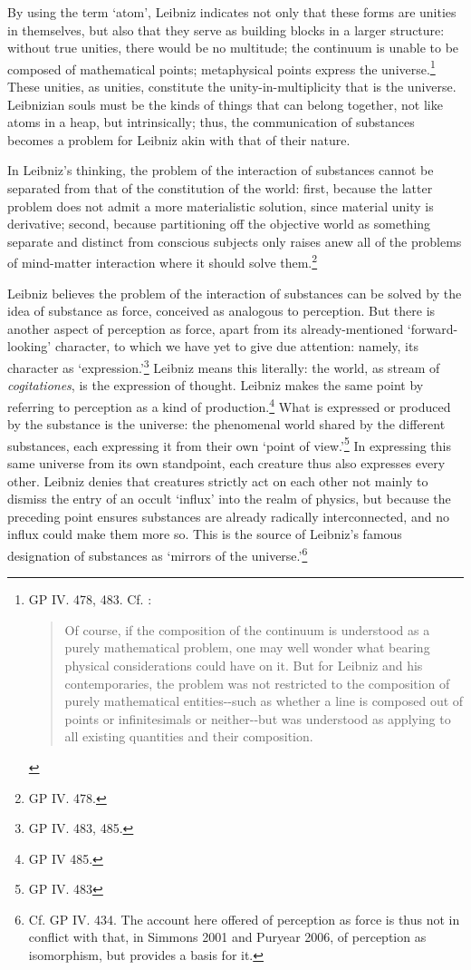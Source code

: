 \documentclass{article}
\begin{document}
By using the term `atom', Leibniz indicates not only that these forms
are unities in themselves, but also that they serve as building blocks
in a larger structure: without true unities, there would be no
multitude; the continuum is unable to be composed of mathematical
points; metaphysical points express the universe.\footnote{GP IV. 478,
  483. Cf. \autocite{Arthur1998}:

  \begin{quote}
  Of course, if the composition of the continuum is understood as a
  purely mathematical problem, one may well wonder what bearing physical
  considerations could have on it. But for Leibniz and his
  contemporaries, the problem was not restricted to the composition of
  purely mathematical entities-\/-such as whether a line is composed out
  of points or infinitesimals or neither-\/-but was understood as
  applying to all existing quantities and their composition.
  \end{quote}} These unities, as unities, constitute the
unity-in-multiplicity that is the universe. Leibnizian souls must be the
kinds of things that can belong together, not like atoms in a heap, but
intrinsically; thus, the communication of substances becomes a problem
for Leibniz akin with that of their nature.

In Leibniz's thinking, the problem of the interaction of substances
cannot be separated from that of the constitution of the world: first,
because the latter problem does not admit a more materialistic solution,
since material unity is derivative; second, because partitioning off the
objective world as something separate and distinct from conscious
subjects only raises anew all of the problems of mind-matter interaction
where it should solve them.\footnote{GP IV. 478.}

Leibniz believes the problem of the interaction of substances can be
solved by the idea of substance as force, conceived as analogous to
perception. But there is another aspect of perception as force, apart
from its already-mentioned `forward-looking' character, to which we have
yet to give due attention: namely, its character as
`expression.'\footnote{GP IV. 483, 485.} Leibniz means this literally:
the world, as stream of \emph{cogitationes}, is the expression of
thought. Leibniz makes the same point by referring to perception as a
kind of production.\footnote{GP IV 485.} What is expressed or produced
by the substance is the universe: the phenomenal world shared by the
different substances, each expressing it from their own `point of
view.'\footnote{GP IV. 483} In expressing this same universe from its
own standpoint, each creature thus also expresses every other. Leibniz
denies that creatures strictly act on each other not mainly to dismiss
the entry of an occult `influx' into the realm of physics, but because
the preceding point ensures substances are already radically
interconnected, and no influx could make them more so. This is the
source of Leibniz's famous designation of substances as `mirrors of the
universe.'\footnote{Cf. GP IV. 434. The account here offered of
  perception as force is thus not in conflict with that, in Simmons 2001
  and Puryear 2006, of perception as isomorphism, but provides a basis
  for it.}
\end{document}
